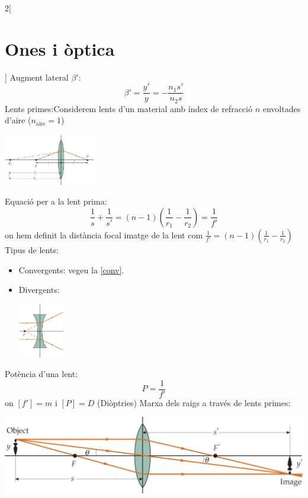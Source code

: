 \documentclass[../../../main.tex]{subfiles}
\begin{document}
\begin{multicols}{2}[\section{Ones i òptica}]
  Augment lateral $\beta'$:
  $$\beta'=\frac{y'}{y}=-\frac{n_1s'}{n_2s}$$
  Lents primes:\newline Considerem lents d'un material amb índex de refracció $n$ envoltades d'aire ($n_{\text{aire}}=1$)
  \begin{minipage}{\linewidth}
    \centering
    \includegraphics[width=4cm]{Physics/1st/Waves_and_optics/Images/lens.jpg}
    \label{conv}
  \end{minipage}
  Equació per a la lent prima: $$\frac{1}{s}+\frac{1}{s'}=(n-1)\left(\frac{1}{r_1}-\frac{1}{r_2}\right)=\frac{
      1}{f'}$$ {\footnotesize on hem definit la distància focal imatge de la lent com $\frac{
          1}{f'}=(n-1)\left(\frac{1}{r_1}-\frac{1}{r_2}\right)$}\newline
  Tipus de lents:
  \begin{itemize}
    \item Convergents: {\footnotesize vegeu la \cref{conv}.}
    \item Divergents:\newline
          \begin{minipage}{\linewidth}
            \centering
            \includegraphics[width=2cm]{Physics/1st/Waves_and_optics/Images/div.jpg}
          \end{minipage}
  \end{itemize}
  Potència d'una lent: $$P=\frac{1}{f'}$$ {\footnotesize on $[f']=m$ i $[P]=D$ (Diòptries)}\newline
  Marxa dels raigs a través de lents primes:
  \begin{minipage}{\linewidth}
    \centering
    \includegraphics[width=\linewidth]{Physics/1st/Waves_and_optics/Images/raiglen.jpg}

\end{minipage}
\end{multicols}
\end{document}
